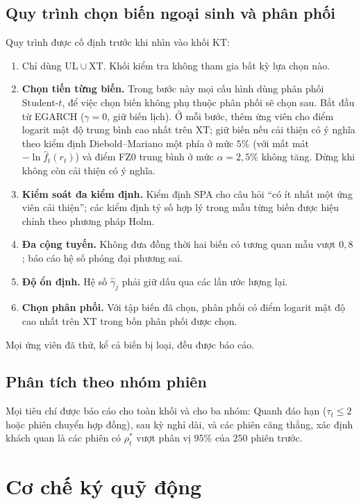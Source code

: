 \documentclass[12pt,a4paper]{article}
\theoremstyle{definition}
\theoremstyle{remark}
\newcommand{\UL}{\mathrm{UL}}
\newcommand{\XT}{\mathrm{XT}}
\newcommand{\KT}{\mathrm{KT}}
\begin{document}
\subsection{Quy trình chọn biến ngoại sinh và phân phối}\label{sec:chonbien}

Quy trình được cố định trước khi nhìn vào khối $\KT$:
\begin{enumerate}
\item Chỉ dùng $\UL\cup\XT$. Khối kiểm tra không tham gia bất kỳ lựa chọn nào.
\item \textbf{Chọn tiến từng biến.} Trong bước này mọi cấu hình dùng phân phối Student-$t$, để việc chọn biến không phụ thuộc phân phối sẽ chọn sau. Bắt đầu từ EGARCH ($\gamma=0$, giữ biến lịch). Ở mỗi bước, thêm ứng viên cho điểm logarit mật độ trung bình cao nhất trên $\XT$; giữ biến nếu cải thiện có ý nghĩa theo kiểm định Diebold--Mariano một phía ở mức $5\%$ (với mất mát $-\ln\hat f_t(r_t)$) và điểm FZ0 trung bình ở mức $\alpha=2{,}5\%$ không tăng. Dừng khi không còn cải thiện có ý nghĩa.
\item \textbf{Kiểm soát đa kiểm định.} Kiểm định SPA cho câu hỏi ``có ít nhất một ứng viên cải thiện''; các kiểm định tỷ số hợp lý trong mẫu từng biến được hiệu chỉnh theo phương pháp Holm.
\item \textbf{Đa cộng tuyến.} Không đưa đồng thời hai biến có tương quan mẫu vượt $0{,}8$; báo cáo hệ số phóng đại phương sai.
\item \textbf{Độ ổn định.} Hệ số $\hat\gamma_j$ phải giữ dấu qua các lần ước lượng lại.
\item \textbf{Chọn phân phối.} Với tập biến đã chọn, phân phối có điểm logarit mật độ cao nhất trên $\XT$ trong bốn phân phối được chọn.
\end{enumerate}
Mọi ứng viên đã thử, kể cả biến bị loại, đều được báo cáo.

\subsection{Phân tích theo nhóm phiên}

Mọi tiêu chí được báo cáo cho toàn khối và cho ba nhóm: Quanh đáo hạn ($\tau_t\le2$ hoặc phiên chuyển hợp đồng), sau kỳ nghỉ dài, và các phiên căng thẳng, xác định khách quan là các phiên có $\rho^{*}_t$ vượt phân vị $95\%$ của $250$ phiên trước.

\section{Cơ chế ký quỹ động}\label{sec:kyquy}
\end{document}
